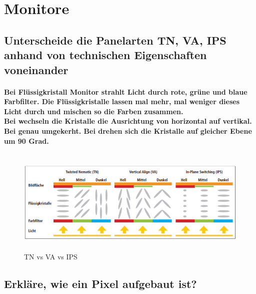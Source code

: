 \documentclass[a4paper]{article}
\begin{document}
    \section{Monitore}\label{sec:monitore}

    \subsection{\color{red}Unterscheide die Panelarten TN, VA, IPS anhand von technischen Eigenschaften voneinander}\label{subsec:unterscheide-die-panelarten-tn-va-ips-anhand-von-technischen-eigenschaften-voneinander}
    \paragraph{\color{codegreen} Bei Flüssigkristall Monitor strahlt Licht durch rote, grüne und blaue Farbfilter. Die Flüssigkristalle lassen mal mehr, mal weniger dieses Licht durch und mischen so die Farben zusammen.\\
    Bei \color{red}{\fbseries TN-Panels }\color{codegreen} wechseln die Kristalle die Ausrichtung von horizontal auf vertikal. Bei \color{red}{\fbseries AV-Panels }\color{codegreen} genau umgekerht. Bei \color{red}{\fbseries IPS-Panels }\color{codegreen} drehen sich die Kristalle auf gleicher Ebene um 90 Grad.}
    \begin{center}
        \begin{figure}[H]
            \centering
            \includegraphics[height=5cm]{media/panals}
            \captionsetup{labelformat=empty}
            \caption{TN vs VA vs IPS}
            \label{fig:panals}
        \end{figure}
    \end{center}

    \subsection{\color{red}Erkläre, wie ein Pixel aufgebaut ist?}\label{subsec:erkläre-wie-ein-pixel-aufgebaut-ist?}
\end{document}
